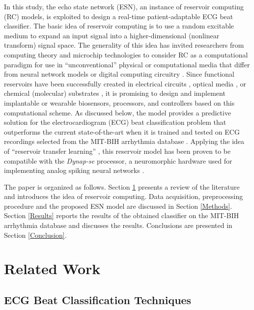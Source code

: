 \documentclass[review]{elsarticle}
\begin{document}
In this study, the echo state network (ESN), an instance of reservoir computing (RC) models, is exploited to design a real-time patient-adaptable ECG beat classifier. The basic idea of reservoir computing is to use a random excitable medium to expand an input signal into a higher-dimensional (nonlinear transform) signal space. The generality of this idea has invited researchers from computing theory and microchip technologies to consider RC as a computational paradigm for use in ``unconventional'' physical or computational media that differ from neural network models or digital computing circuitry \cite{tanaka2019recent}. Since functional reservoirs have been successfully created in electrical circuits \cite{schrauwen2008compact,he2018EMBS}, optical media \cite{freiberger2017chip}, or chemical (molecular) substrates \cite{goudarzi2013dna}, it is promising to design and implement implantable or wearable biosensors, processors, and controllers based on this computational scheme. As discussed below, the model provides a predictive solution for the electrocardiogram (ECG) beat classification problem that outperforms the current state-of-the-art when it is trained and tested on ECG recordings selected from the MIT-BIH arrhythmia database \cite{goldberger2000physiobank,moody2001impact}. Applying the idea of ``reservoir transfer learning'' \cite{he2018EMBS}, this reservoir model has been proven to be compatible with the \textit{Dynap-se} processor, a neuromorphic hardware used for implementing analog spiking neural networks \cite{moradi2018scalable}. 

The paper is organized as follows. Section \ref{Related Works} presents a review of the literature and introduces the idea of reservoir computing. Data acquisition, preprocessing procedure and the proposed ESN model are discussed in Section \ref{Methods}. Section \ref{Results} reports the results of the obtained classifier on the MIT-BIH arrhythmia database and discusses the results. Conclusions are presented in Section \ref{Conclusion}.

\section{Related Work}\label{Related Works}
\subsection{ECG Beat Classification Techniques}
\end{document}
